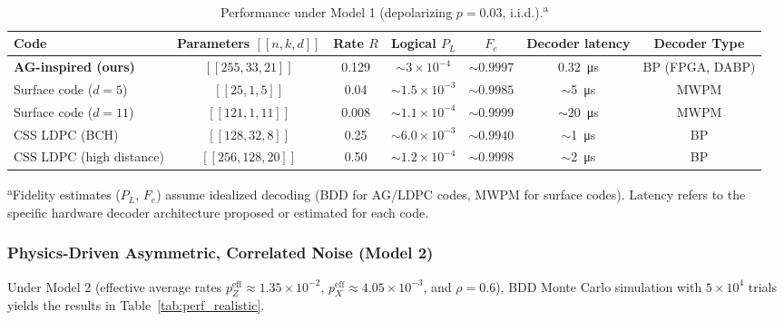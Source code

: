 \documentclass[conference]{IEEEtran}
\begin{document}
\begin{table*}[t]
\centering
\caption{Performance under Model 1 (depolarizing \(p=0.03\), i.i.d.).\textsuperscript{a}}
\label{tab:perf_idealized}
\begin{tabular}{lcccccc}
\toprule
\textbf{Code} & \textbf{Parameters $[[n,k,d]]$} & \textbf{Rate $R$} & \textbf{Logical $P_L$} & \textbf{$F_e$} & \textbf{Decoder latency} & \textbf{Decoder Type} \\
\midrule
\textbf{AG-inspired (ours)} & $[[255,33,21]]$ & 0.129 & \(\sim 3\times 10^{-4}\) & \(\sim 0.9997\) & \SI{0.32}{\micro\second} & BP (FPGA, DABP) \\
Surface code ($d=5$) & $[[25,1,5]]$ & 0.04 & \(\sim 1.5\times 10^{-3}\) & \(\sim 0.9985\) & \(\sim\)\SI{5}{\micro\second} & MWPM \\
Surface code ($d=11$) & $[[121,1,11]]$ & 0.008 & \(\sim 1.1\times 10^{-4}\) & \(\sim 0.9999\) & \(\sim\)\SI{20}{\micro\second} & MWPM \\
CSS LDPC (BCH) & $[[128,32,8]]$ & 0.25 & \(\sim 6.0\times 10^{-3}\) & \(\sim 0.9940\) & \(\sim\)\SI{1}{\micro\second} & BP \\
CSS LDPC (high distance) & $[[256,128,20]]$ & 0.50 & \(\sim 1.2\times 10^{-4}\) & \(\sim 0.9998\) & \(\sim\)\SI{2}{\micro\second} & BP \\
\bottomrule
\end{tabular}
\textsuperscript{a}{\footnotesize Fidelity estimates ($P_L$, $F_e$) assume idealized decoding (BDD for AG/LDPC codes, MWPM for surface codes). Latency refers to the specific hardware decoder architecture proposed or estimated for each code.}
\end{table*}

\subsubsection{Physics-Driven Asymmetric, Correlated Noise (Model 2)}\label{sec:realistic}
Under Model 2 (effective average rates \(p_Z^{\mathrm{eff}}\approx1.35\times10^{-2}\), \(p_X^{\mathrm{eff}}\approx4.05\times10^{-3}\), and \(\rho=0.6\)), BDD Monte Carlo simulation with \(5\times10^4\) trials yields the results in Table~\ref{tab:perf_realistic}.
\end{document}
